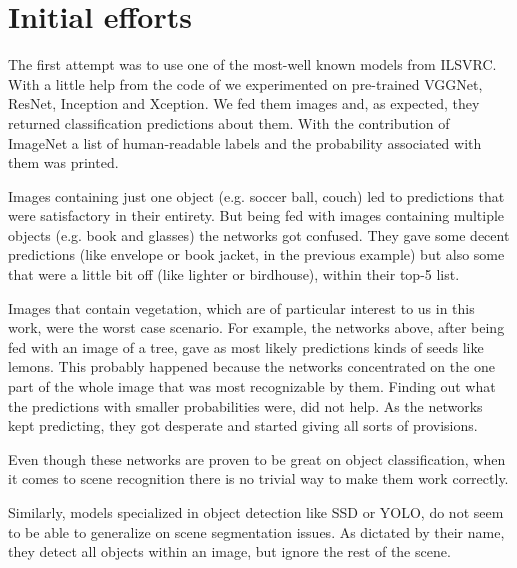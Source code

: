 \documentclass[12pt,a4paper,table,dvipsnames,tikz]{report}
\newcommand{\acronym}{\MakeUppercase}
\begin{document}
	\section{Initial efforts}
	\label{sec:fg:ef}
	
	The first attempt was to use one of the most-well known models from \acronym{ilsvrc}. 
	With a little help from the code of \citet{Rosebrocke} we experimented on 
	pre-trained VGGNet, ResNet, Inception and Xception. We fed them images and, 
	as expected, they returned classification predictions about them. With the 
	contribution of ImageNet a list of human-readable labels and the probability 
	associated with them was printed.
	\par
	Images containing just one object (e.g. soccer ball, couch) led to predictions 
	that were satisfactory in their entirety. But being fed with images containing 
	multiple objects (e.g. book and glasses) the networks got confused. They gave 
	some decent predictions (like envelope or book jacket, in the previous example) 
	but also some that were a little bit off (like lighter or birdhouse), within 
	their top-5 list.
	\par
	Images that contain vegetation, which are of particular interest to us in this work, 
	were the worst case scenario. For example, the networks above, after being fed with 
	an image of a tree, gave as most likely predictions kinds of seeds like lemons. This 
	probably happened because the networks concentrated on the one part of the whole image 
	that was most recognizable by them. Finding out what the predictions with smaller 
	probabilities were, did not help. As the networks kept predicting, they got desperate 
	and started giving all sorts of provisions. 
	\par
	Even though these networks are proven to be great on object classification, when 
	it comes to scene recognition there is no trivial way to make them work correctly.
	\par
	Similarly, models specialized in object detection like \acronym{ssd} or \acronym{yolo}, 
	do not seem to be able to generalize on scene segmentation issues. As dictated by their 
	name, they detect all objects within an image, but ignore the rest of the scene.
	\\
	
\end{document}
